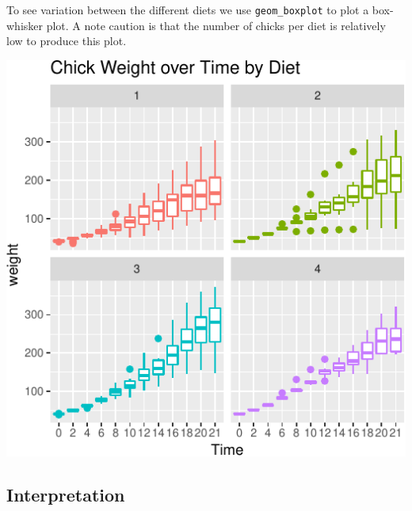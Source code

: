\documentclass[a4paper,9pt,twocolumn,twoside,printwatermark=false]{pinp}
\begin{document}
To see variation between the different diets we use
\texttt{geom\_boxplot} to plot a box-whisker plot. A note caution is
that the number of chicks per diet is relatively low to produce this
plot.

\begin{Shaded}
\begin{Highlighting}[]
\OperatorTok{+}
\StringTok{  }\NormalTok{(}\OperatorTok{~}\OperatorTok{+}
\StringTok{  }\NormalTok{() }\OperatorTok{+}
\StringTok{  }\NormalTok{(} \NormalTok{) }\OperatorTok{+}
\StringTok{  }\NormalTok{(}\NormalTok{)}
\end{Highlighting}
\end{Shaded}

\begin{center}\includegraphics{Getting-Started-in-R_files/figure-latex/boxPlot-1} \end{center}

\subsection{Interpretation}\label{interpretation-4}
\end{document}
